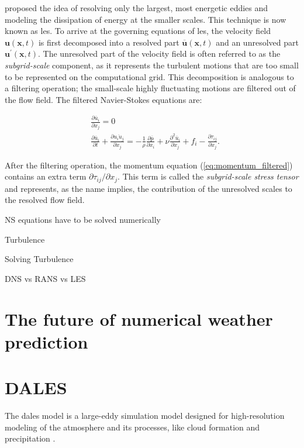 \citet{smagorinskyGeneralCirculationExperiments1963} proposed the idea of resolving only the largest, most energetic eddies and modeling the dissipation of energy at the smaller scales. This technique is now known as \acrfull{les}. To arrive at the governing equations of \acrshort{les}, the velocity field $\mathbf{u}(\mathbf{x},t)$ is first decomposed into a resolved part $\overline{\mathbf{u}}(\mathbf{x},t)$ and an unresolved part $\mathbf{u}^\prime(\mathbf{x},t)$. The unresolved part of the velocity field is often referred to as the \emph{subgrid-scale} component, as it represents the turbulent motions that are too small to be represented on the computational grid. This decomposition is analogous to a filtering operation; the small-scale highly fluctuating motions are filtered out of the flow field. The filtered Navier-Stokes equations are:

\begin{align}
    &\frac{\partial \overline{u}_i}{\partial x_j} = 0 \label{eq:continuity_filtered}\\ 
    &\frac{\partial \overline{u}_i}{\partial t} + \frac{\partial \overline{u_i u_j}}{\partial x_j} = - \frac{1}{\rho} \frac{\partial \overline{p}}{\partial x_i} + \nu \frac{\partial^2 \overline{u}_i}{\partial x_j} + f_i - \frac{\partial \tau_{ij}}{\partial x_j}.  \label{eq:momentum_filtered}
\end{align}

After the filtering operation, the momentum equation (\autoref{eq:momentum_filtered}) contains an extra term $\partial \tau_{ij} / \partial x_j$. This term is called the \emph{subgrid-scale stress tensor} and represents, as the name implies, the contribution of the unresolved scales to the resolved flow field. 


NS equations have to be solved numerically

Turbulence 

Solving Turbulence

DNS vs RANS vs LES

\section{The future of numerical weather prediction}

\section{DALES}
The \acrfull{dales} model is a large-eddy simulation model designed for high-resolution modeling of the atmosphere and its processes, like cloud formation and precipitation \citep{heusFormulationDutchAtmospheric2010,ouwerslootLargeEddySimulationComparison2017}. 

